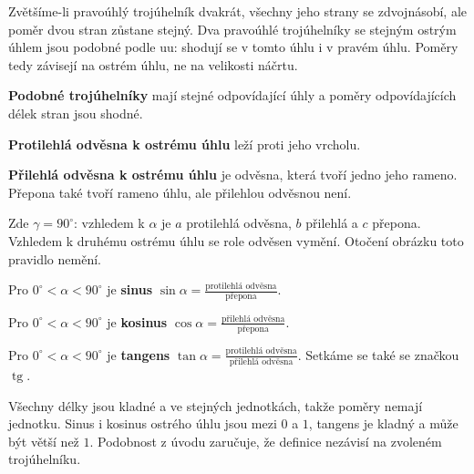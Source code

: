 \documentclass[11pt,a4paper]{article}
\begin{document}
Zvětšíme-li pravoúhlý trojúhelník dvakrát, všechny jeho strany se zdvojnásobí,
ale poměr dvou stran zůstane stejný. Dva pravoúhlé trojúhelníky se stejným
ostrým úhlem jsou podobné podle uu: shodují se v tomto úhlu i v pravém úhlu.
Poměry tedy závisejí na ostrém úhlu, ne na velikosti náčrtu.

\begin{definiceBox}
\textbf{Podobné trojúhelníky} mají stejné odpovídající úhly a poměry
odpovídajících délek stran jsou shodné.
\end{definiceBox}
\begin{definiceBox}
\textbf{Protilehlá odvěsna k ostrému úhlu} leží proti jeho vrcholu.
\end{definiceBox}
\begin{definiceBox}
\textbf{Přilehlá odvěsna k ostrému úhlu} je odvěsna, která tvoří jedno jeho rameno.
Přepona také tvoří rameno úhlu, ale přilehlou odvěsnou není.
\end{definiceBox}
\begin{center}
\end{center}
Zde $\gamma=90^\circ$: vzhledem k $\alpha$ je $a$ protilehlá odvěsna,
$b$ přilehlá a $c$ přepona. Vzhledem k druhému ostrému úhlu se role odvěsen vymění.
Otočení obrázku toto pravidlo nemění.

\begin{definiceBox}
Pro $0^\circ<\alpha<90^\circ$ je \textbf{sinus}
$\displaystyle\sin\alpha=\frac{\text{protilehlá odvěsna}}{\text{přepona}}$.
\end{definiceBox}
\begin{definiceBox}
Pro $0^\circ<\alpha<90^\circ$ je \textbf{kosinus}
$\displaystyle\cos\alpha=\frac{\text{přilehlá odvěsna}}{\text{přepona}}$.
\end{definiceBox}
\begin{definiceBox}
Pro $0^\circ<\alpha<90^\circ$ je \textbf{tangens}
$\displaystyle\tan\alpha=\frac{\text{protilehlá odvěsna}}{\text{přilehlá odvěsna}}$.
Setkáme se také se značkou $\operatorname{tg}$.
\end{definiceBox}
Všechny délky jsou kladné a ve stejných jednotkách, takže poměry nemají jednotku.
Sinus i kosinus ostrého úhlu jsou mezi $0$ a $1$, tangens je kladný
a může být větší než $1$. Podobnost z úvodu zaručuje, že definice nezávisí
na zvoleném trojúhelníku.
\end{document}
